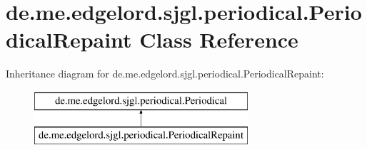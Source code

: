 \hypertarget{classde_1_1me_1_1edgelord_1_1sjgl_1_1periodical_1_1_periodical_repaint}{}\section{de.\+me.\+edgelord.\+sjgl.\+periodical.\+Periodical\+Repaint Class Reference}
\label{classde_1_1me_1_1edgelord_1_1sjgl_1_1periodical_1_1_periodical_repaint}
Inheritance diagram for de.\+me.\+edgelord.\+sjgl.\+periodical.\+Periodical\+Repaint\+:\begin{figure}[H]
\begin{center}
\leavevmode
\includegraphics[height=2.000000cm]{classde_1_1me_1_1edgelord_1_1sjgl_1_1periodical_1_1_periodical_repaint}
\end{center}
\end{figure}
